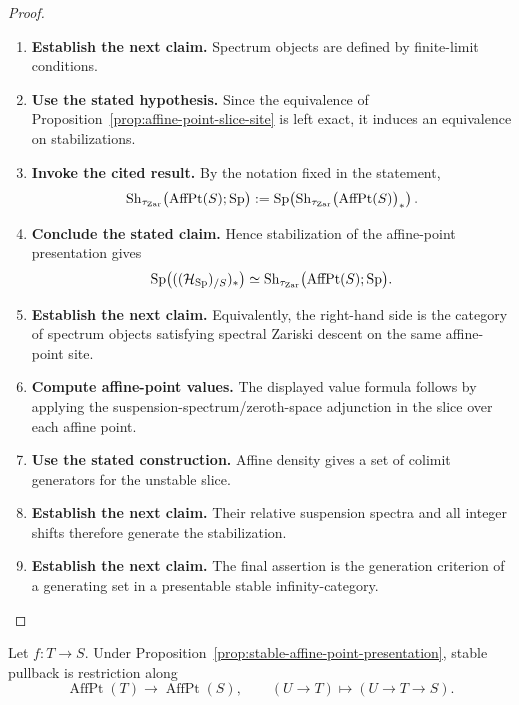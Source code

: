 \begin{proof}
\leavevmode
\begin{enumerate}[label=\textup{(\arabic*)}]
    \item \textbf{Establish the next claim.}
    Spectrum objects are defined by finite-limit conditions.
    \item \textbf{Use the stated hypothesis.}
    Since the equivalence of
    Proposition~\ref{prop:affine-point-slice-site} is left exact, it induces an
    equivalence on stabilizations.
    \item \textbf{Invoke the cited result.}
    By the notation fixed in the statement,
    \[
    \operatorname{Sh}_{\tau_{\mathrm{Zar}}}
    \bigl(\operatorname{AffPt}(S);\operatorname{Sp}\bigr)
    :=
    \operatorname{Sp}\!\left(
    \operatorname{Sh}_{\tau_{\mathrm{Zar}}}
    \bigl(\operatorname{AffPt}(S)\bigr)_*
    \right).
    \]
    \item \textbf{Conclude the stated claim.}
    Hence stabilization of the affine-point presentation gives
    \[
    \operatorname{Sp}\bigl(((\mathcal H_{\operatorname{Sp}})_{/S})_*\bigr)
    \simeq
    \operatorname{Sh}_{\tau_{\mathrm{Zar}}}
    \bigl(\operatorname{AffPt}(S);\operatorname{Sp}\bigr).
    \]
    \item \textbf{Establish the next claim.}
    Equivalently, the right-hand side is the category of spectrum objects satisfying
    spectral Zariski descent on the same affine-point site.
    \item \textbf{Compute affine-point values.}
    The displayed value formula follows by applying the
    suspension-spectrum/zeroth-space adjunction in the slice over each affine point.
    \item \textbf{Use the stated construction.}
    Affine density gives a set of colimit generators for the unstable slice.
    \item \textbf{Establish the next claim.}
    Their
    relative suspension spectra and all integer shifts therefore generate the
    stabilization.
    \item \textbf{Establish the next claim.}
    The final assertion is the generation criterion of a generating
    set in a presentable stable infinity-category.
\end{enumerate}
\end{proof}

\begin{proposition}
\label{prop:stable-affine-point-pullback-t-structure}
Let \(f:T\to S\). Under
Proposition~\ref{prop:stable-affine-point-presentation}, stable pullback is
restriction along
\[
    \operatorname{AffPt}(T)\longrightarrow\operatorname{AffPt}(S),
    \qquad
    (U\to T)\longmapsto(U\to T\to S).
  \]
\end{proposition}

